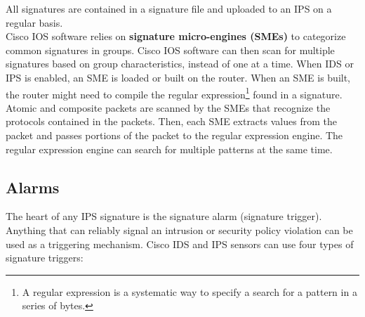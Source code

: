 All signatures are contained in a signature file and uploaded to an IPS on a regular basis.\\

Cisco IOS software relies on \textbf{signature micro-engines (SMEs)} to categorize common signatures in groups. Cisco IOS software can then scan for multiple signatures based on group characteristics, instead of one at a time. When IDS or IPS is enabled, an SME is loaded or built on the router. When an SME is built, the router might need to compile the regular expression\footnote{A regular expression is a systematic way to specify a search for a pattern in a series of bytes.} found in a signature. \\

Atomic and composite packets are scanned by the SMEs that recognize the protocols contained in the packets. Then, each SME extracts values from the packet and passes portions of the packet to the regular expression engine. The regular expression engine can search for multiple patterns at the same time. 

\subsection{Alarms}

The heart of any IPS signature is the signature alarm (signature trigger). Anything that can reliably signal an intrusion or security policy violation can be used as a triggering mechanism. Cisco IDS and IPS sensors can use four types of signature triggers:

